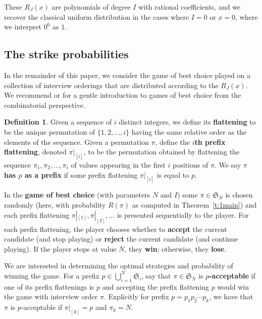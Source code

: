 \documentclass[11pt]{amsart}   %
\theoremstyle{definition}
\newtheorem{definition}[theorem]{Definition}
\theoremstyle{remark}
\numberwithin{equation}{section}
\theoremstyle{theorem}
\newcommand{\SN}{\mathfrak{S}}
\newcommand{\pf}[1]{\pi|_{[#1]}}
\begin{document}
These $R_J(x)$ are polynomials of degree $I$ with rational coefficients, and we recover the classical uniform distribution in the cases where $I = 0$ or $x = 0$, where we interpret $0^0$ as $1$.

\bigskip
\subsection{The strike probabilities}\label{s:strike}

In the remainder of this paper, we consider the game of best choice played on a
collection of interview orderings that are distributed according to the
$R_J(x)$.  We recommend \cite{weighted} or \cite{jones18} for a gentle
introduction to games of best choice from the combinatorial perspective.  

\begin{definition}\label{d:pflat}
Given a sequence of $i$ distinct integers, we define its {\bf flattening} to be
the unique permutation of $\{1, 2, \ldots, i\}$ having the same relative order
as the elements of the sequence.  Given a permutation $\pi$, define the {\bf
$i$th prefix flattening}, denoted $\pf{i}$, to be the permutation obtained by
flattening the sequence $\pi_1, \pi_2, \ldots, \pi_i$ of values appearing in
the first $i$ positions of $\pi$.  We say $\pi$ {\bf has $p$ as a prefix} if
some prefix flattening $\pf{i}$ is equal to $p$.

In the {\bf game of best choice} (with parameters $N$ and $I$) some $\pi \in
\SN_N$ is chosen randomly (here, with probability $R(\pi)$ as computed in
Theorem~\ref{t:1main}) and each prefix flattening $\pf{1}, \pf{2}, \ldots$ is
presented sequentially to the player.  For each prefix flattening, the player
chooses whether to {\bf accept} the current candidate (and stop playing) or
{\bf reject} the current candidate (and continue playing).  If the player stops
at value $N$, they {\bf win}; otherwise, they {\bf lose}.
\end{definition}

We are interested in determining the optimal strategies and probability of
winning the game.  For a prefix $p \in \bigcup_{i=1}^N \SN_i$, say that $\pi
\in \SN_N$ is {\bf $p$-acceptable} if one of its prefix flattenings is $p$ and
accepting the prefix flattening $p$ would win the game with interview order
$\pi$.  Explicitly for prefix $p = p_1 p_2 \cdots p_k$, we have that $\pi$ is
$p$-acceptable if $\pf{k} = p$ and $\pi_k = N$.  
\end{document}
